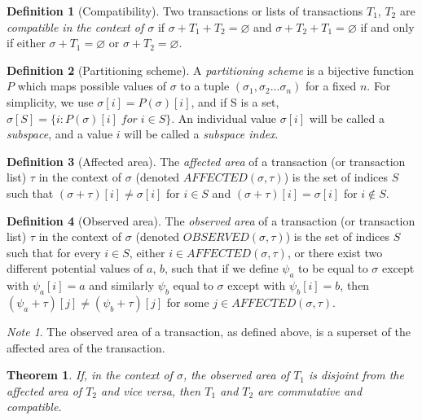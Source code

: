 \documentclass[11pt,a4paper]{report}
\theoremstyle{plain}
\newtheorem{thm}{Theorem}[section]
\theoremstyle{definition}
\newtheorem{defn}{Definition}[chapter]
\theoremstyle{remark}
\newtheorem*{note}{Note}
\begin{document}
\begin{defn}[Compatibility]
Two transactions or lists of transactions $T_1$, $T_2$ are \emph{compatible in the context of $\sigma$} if $\sigma + T_1 + T_2 = \varnothing$ and $\sigma + T_2 + T_1 = \varnothing$ if and only if either $\sigma + T_1 = \varnothing$ or $\sigma + T_2 = \varnothing$.
\end{defn}

\begin{defn}[Partitioning scheme]
A \emph{partitioning scheme} is a bijective function $P$ which maps possible values of $\sigma$ to a tuple $(\sigma_1, \sigma_2 ... \sigma_n)$ for a fixed $n$. For simplicity, we use $\sigma[i] = P(\sigma)[i]$, and if S is a set, $\sigma[S] = \{i: P(\sigma)[i] \; for \; i \in S\}$. An individual value $\sigma[i]$ will be called a \emph{subspace}, and a value $i$ will be called a \emph{subspace index}.
\end{defn}

\begin{defn}[Affected area]
The \emph{affected area} of a transaction (or transaction list) $\tau$ in the context of $\sigma$ (denoted $AFFECTED(\sigma, \tau)$) is the set of indices $S$ such that $(\sigma + \tau)[i] \ne \sigma[i]$ for $i \in S$ and $(\sigma + \tau)[i] = \sigma[i]$ for $i \notin S$.
\end{defn}

\begin{defn}[Observed area]
The \emph{observed area} of a transaction (or transaction list) $\tau$ in the context of $\sigma$ (denoted $OBSERVED(\sigma, \tau)$) is the set of indices $S$ such that for every $i \in S$, either $i \in AFFECTED(\sigma, \tau)$, or there exist two different potential values of $a$, $b$, such that if we define $\psi_a$ to be equal to $\sigma$ except with $\psi_a[i] = a$ and similarly $\psi_b$ equal to $\sigma$ except with $\psi_b[i] = b$, then $(\psi_a + \tau)[j] \ne (\psi_b + \tau)[j]$ for some $j \in AFFECTED(\sigma, \tau)$.
\end{defn}

\begin{note}
The observed area of a transaction, as defined above, is a superset of the affected area of the transaction.
\end{note}

\begin{thm}
If, in the context of $\sigma$, the observed area of $T_1$ is disjoint from the affected area of $T_2$ and vice versa, then $T_1$ and $T_2$ are commutative and compatible.
\end{thm}
\end{document}
